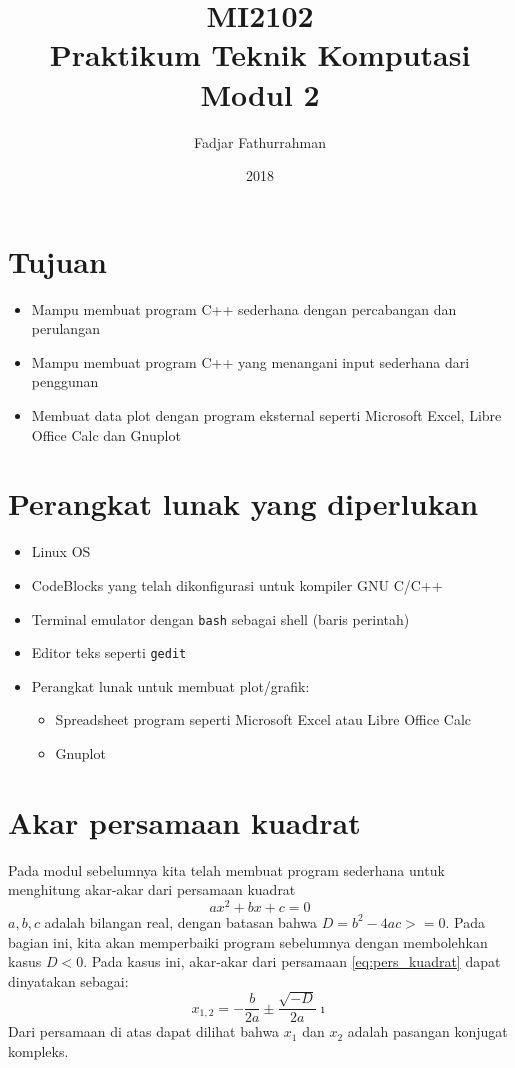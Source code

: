 \documentclass[a4paper,11pt]{extarticle}
\title{
MI2102\\
Praktikum Teknik Komputasi\\
Modul 2}
\author{Fadjar Fathurrahman}
\date{2018}
\begin{document}
\maketitle

\section{Tujuan}
\begin{itemize}
\item Mampu membuat program C++ sederhana dengan percabangan dan perulangan
\item Mampu membuat program C++ yang menangani input sederhana dari penggunan
\item Membuat data plot dengan program eksternal seperti \textsf{Microsoft Excel},
\textsf{Libre Office Calc} dan \textsf{Gnuplot}
\end{itemize}

\section{Perangkat lunak yang diperlukan}
\begin{itemize}
\item Linux OS
\item CodeBlocks yang telah dikonfigurasi untuk kompiler GNU C/C++
\item Terminal emulator dengan \texttt{bash} sebagai shell (baris perintah)
\item Editor teks seperti \texttt{gedit}
\item Perangkat lunak untuk membuat plot/grafik:
\begin{itemize}
\item Spreadsheet program seperti \textsf{Microsoft Excel} atau \textsf{Libre Office Calc}
\item \textsf{Gnuplot}
\end{itemize}
\end{itemize}

\section{Akar persamaan kuadrat}
Pada modul sebelumnya kita telah membuat program sederhana untuk menghitung
akar-akar dari persamaan kuadrat
\begin{equation}
ax^2 + bx + c = 0
\label{eq:pers_kuadrat}
\end{equation}
$a, b, c$ adalah bilangan real, dengan batasan bahwa $D = b^2 - 4ac >= 0$.
Pada bagian ini, kita akan memperbaiki program sebelumnya dengan
membolehkan kasus $D < 0$. Pada kasus ini, akar-akar dari persamaan
\ref{eq:pers_kuadrat} dapat dinyatakan sebagai:
\begin{equation}
x_{1,2} = -\frac{b}{2a} \pm \frac{\sqrt{-D}}{2a}\imath
\end{equation}
Dari persamaan di atas dapat dilihat bahwa $x_{1}$ dan $x_{2}$ adalah
pasangan konjugat kompleks.
\end{document}
